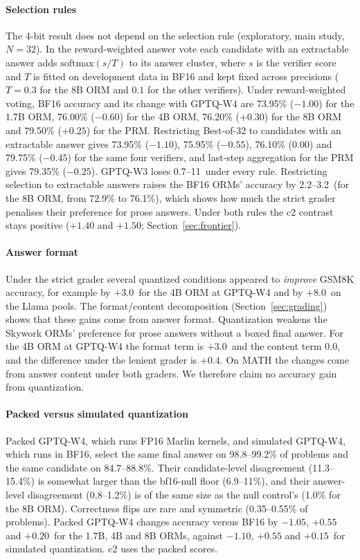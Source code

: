 \paragraph{Selection rules} The 4-bit result does not depend on the selection rule
(exploratory, main study, $N=32$). In the reward-weighted answer vote each candidate
with an extractable answer adds $\mathrm{softmax}(s/T)$ to its answer cluster, where $s$
is the verifier score and $T$ is fitted on development data in BF16 and kept fixed
across precisions ($T=0.3$ for the 8B ORM and $0.1$ for the other verifiers). Under
reward-weighted voting, BF16 accuracy and its change with GPTQ-W4 are 73.95\%
($-1.00$\pp) for the 1.7B ORM, 76.00\% ($-0.60$\pp) for the 4B ORM, 76.20\%
($+0.30$\pp) for the 8B ORM and 79.50\% ($+0.25$\pp) for the PRM. Restricting
Best-of-32 to candidates with an extractable answer gives 73.95\% ($-1.10$\pp), 75.95\%
($-0.55$\pp), 76.10\% ($0.00$\pp) and 79.75\% ($-0.45$\pp) for the same four verifiers,
and last-step aggregation for the PRM gives 79.35\% ($-0.25$\pp). GPTQ-W3 loses
0.7--11\pp\ under every rule. Restricting selection to extractable answers raises the
BF16 ORMs' accuracy by 2.2--3.2\pp\ (for the 8B ORM, from 72.9\% to 76.1\%), which shows
how much the strict grader penalises their preference for prose answers. Under both
rules the c2 contrast stays positive ($+1.40$ and $+1.50$\pp;
Section~\ref{sec:frontier}).

\paragraph{Answer format} Under the strict grader several quantized conditions appeared
to \emph{improve} GSM8K accuracy, for example by $+3.0$\pp\ for the 4B ORM at GPTQ-W4
and by $+8.0$\pp\ on the Llama pools. The format/content decomposition
(Section~\ref{sec:grading}) shows that these gains come from answer format. Quantization
weakens the Skywork ORMs' preference for prose answers without a boxed final answer. For
the 4B ORM at GPTQ-W4 the format term is $+3.0$\pp\ and the content term $0.0$\pp, and
the difference under the lenient grader is $+0.4$\pp. On MATH the changes come from
answer content under both graders. We therefore claim no accuracy gain from
quantization.

\paragraph{Packed versus simulated quantization} Packed GPTQ-W4, which runs FP16 Marlin
kernels, and simulated GPTQ-W4, which runs in BF16, select the same final answer on
98.8--99.2\% of problems and the same candidate on 84.7--88.8\%. Their candidate-level
disagreement (11.3--15.4\%) is somewhat larger than the bf16-null floor (6.9--11\%), and
their answer-level disagreement (0.8--1.2\%) is of the same size as the null control's
(1.0\% for the 8B ORM). Correctness flips are rare and symmetric (0.35--0.55\% of
problems). Packed GPTQ-W4 changes accuracy versus BF16 by $-1.05$, $+0.55$ and
$+0.20$\pp\ for the 1.7B, 4B and 8B ORMs, against $-1.10$, $+0.55$ and $+0.15$\pp\ for
simulated quantization. c2 uses the packed scores.

